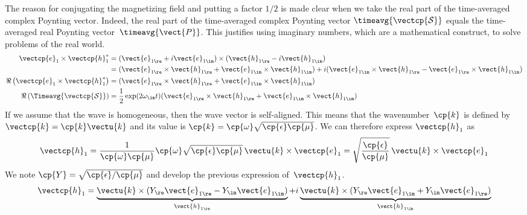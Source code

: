 The reason for conjugating the magnetizing field and putting a factor $1/2$ is made clear when we take the real part of the time-averaged complex Poynting vector.
Indeed, the real part of the time-averaged complex Poynting vector $\timeavg{\vectcp{\mathcal{S}}}$ equals the time-averaged real Poynting vector~$\timeavg{\vect{P}}$.
This justifies using imaginary numbers, which are a mathematical construct, to solve problems of the real world.
\begin{subequations}
    \begin{align}
        \vectcp{e}_1 \times \vectcp{h}_1^*
        &=
        ( \vect{e}_{1\re} + i \vect{e}_{1\im} )
        \times
        ( \vect{h}_{1\re} - i \vect{h}_{1\im} )
        \\
        &=
        (
            \vect{e}_{1\re} \times \vect{h}_{1\re}
            +
            \vect{e}_{1\im} \times \vect{h}_{1\im}
        )
        +
        i
        (
            \vect{e}_{1\im} \times \vect{h}_{1\re}
            -
            \vect{e}_{1\re} \times \vect{h}_{1\im}
        )
        \\
        \Re\left( \vectcp{e}_1 \times \vectcp{h}_1^* \right)
        &=
        (
            \vect{e}_{1\re} \times \vect{h}_{1\re}
            +
            \vect{e}_{1\im} \times \vect{h}_{1\im}
        )
        \\
        \Re\left( \Timeavg{\vectcp{\mathcal{S}}} \right)
        &=
        \frac{1}{2}
        \exp(2\omega_\im t)
        (
            \vect{e}_{1\re} \times \vect{h}_{1\re}
            +
            \vect{e}_{1\im} \times \vect{h}_{1\im}
        )
    \end{align}
\end{subequations}
If we assume that the wave is homogeneous, then the wave vector is self-aligned.
This means that the wavenumber~$\cp{k}$ is defined by $\vectcp{k} = \cp{k} \vectu{k}$ and its value is $\cp{k}=\cp{\omega} \sqrt{\cp{\epsilon} \cp{\mu}}$.
We can therefore express $\vectcp{h}_1$ as
\begin{equation}
    \vectcp{h}_1
    =
    \frac{1}{\cp{\omega} \cp{\mu}}
    \cp{\omega} \sqrt{\cp{\epsilon} \cp{\mu}} \, \vectu{k} \times \vectcp{e}_1
    =
    \sqrt{\frac{\cp{\epsilon}}{\cp{\mu}}} \, \vectu{k} \times \vectcp{e}_1
\end{equation}
We note $\cp{Y}=\sqrt{\cp{\epsilon}/\cp{\mu}}$ and develop the previous expression of~$\vectcp{h}_1$.
\begin{equation}
    \vectcp{h}_1
    =
    \underbrace{\vectu{k} \times
                (Y_\re \vect{e}_{1\re} -
                 Y_\im \vect{e}_{1\im})
               }_{\vect{h}_{1\re}}
    +i
    \underbrace{\vectu{k} \times
                (Y_\re \vect{e}_{1\im} +
                 Y_\im \vect{e}_{1\re})
               }_{\vect{h}_{1\im}}
    \label{eq:h_y_e_phase_difference}
\end{equation}
